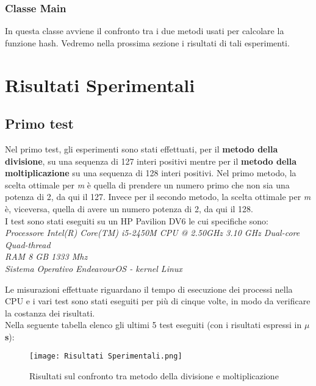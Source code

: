 \documentclass{article}
\begin{document}
\subsubsection{Classe Main}
In questa  classe avviene il confronto tra i due metodi usati per calcolare la funzione hash.
Vedremo nella prossima sezione i risultati di tali esperimenti.

\section{Risultati Sperimentali}
\subsection{Primo test}
Nel primo test, gli esperimenti sono stati effettuati, per il \textbf{metodo della divisione}, su una sequenza di 127 interi positivi mentre per il \textbf{metodo della moltiplicazione} su una sequenza di 128 interi positivi.
Nel primo metodo, la scelta ottimale per \textit{m} è quella di prendere un numero primo che non sia una potenza di 2, da qui il 127.
Invece per il secondo metodo, la scelta ottimale per \textit{m} è, viceversa, quella di avere un numero potenza di 2, da qui il 128. \\
I test sono stati eseguiti su un HP Pavilion DV6 le cui specifiche sono:\\
\textit{Processore Intel(R) Core(TM) i5-2450M CPU @ 2.50GHz 3.10 GHz Dual-core Quad-thread\\}
\textit{RAM 8 GB 1333 Mhz\\}
\textit{Sistema Operativo EndeavourOS - kernel Linux\\}

Le misurazioni effettuate riguardano il tempo di esecuzione dei processi nella CPU e i vari test sono stati eseguiti per più di cinque volte, in modo da verificare la costanza dei risultati.\\
Nella seguente tabella elenco gli ultimi 5 test eseguiti (con i risultati espressi in \textbf{$\mu$s}):
\begin{figure}[!ht]
        \centering
        \texttt{[image: Risultati Sperimentali.png]}
        \caption{Risultati sul confronto tra metodo della divisione e moltiplicazione}
        \label{fig:risMethods}
\end{figure}
\end{document}
